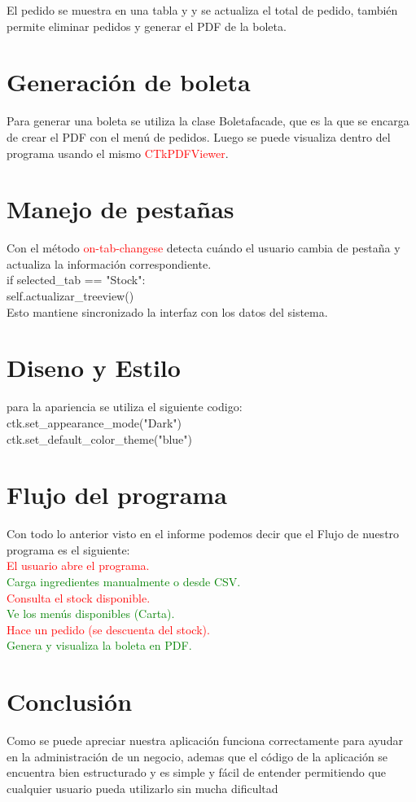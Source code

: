 \documentclass{article}
\begin{document}
El pedido se muestra en una tabla y y se actualiza el total de pedido, también permite eliminar pedidos y generar el PDF de la boleta.

\section{Generación de boleta}
Para generar una boleta se utiliza la clase Boletafacade, que es la que se encarga de crear el PDF con el menú de pedidos. Luego se puede  visualiza dentro del programa usando el mismo \textcolor{red}{CTkPDFViewer}.

\section{Manejo de pestañas}
Con el método \textcolor{red}{on-tab-changese}  detecta cuándo el usuario cambia de pestaña y actualiza la información correspondiente.\\

if selected_tab == "Stock":\\
    self.actualizar_treeview()\\

Esto mantiene sincronizado la interfaz con los datos del sistema.

\section{Diseno y Estilo}
para la apariencia se utiliza el siguiente codigo:\\
ctk.set_appearance_mode("Dark")\\
ctk.set_default_color_theme("blue")\\

\section{Flujo del programa}
Con todo lo anterior visto en el informe podemos decir que el Flujo de nuestro programa es el siguiente:\\
\textcolor{red}{El usuario abre el programa.}\\
\textcolor{green}{Carga ingredientes manualmente o desde CSV.}\\
\textcolor{red}{Consulta el stock disponible.}\\
\textcolor{green}{Ve los menús disponibles (Carta).}\\
\textcolor{red}{Hace un pedido (se descuenta del stock).}\\
\textcolor{green}{Genera y visualiza la boleta en PDF.}\\

\section{Conclusión}
Como se puede apreciar nuestra aplicación funciona correctamente para ayudar en la administración de un negocio, ademas que el código de la aplicación se encuentra bien estructurado y es simple y fácil de entender permitiendo que cualquier usuario pueda utilizarlo sin mucha dificultad
\end{document}
